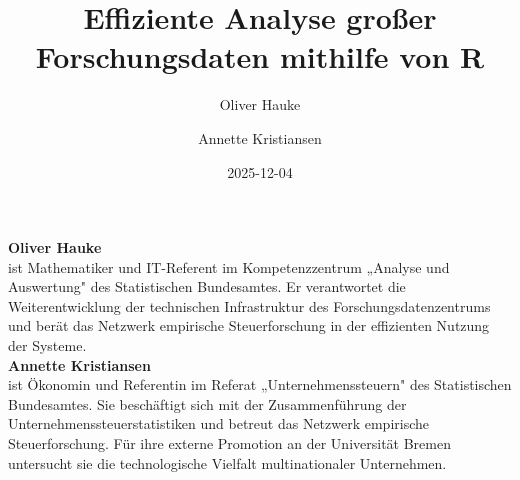 \documentclass[
  german,
  10pt,
  twoside]{article}
\title{Effiziente Analyse großer Forschungsdaten mithilfe von R}
\author{Oliver Hauke \and Annette Kristiansen}
\date{2025-12-04}
\renewcommand{\maketitle}{}
\begin{document}
\maketitle

\begin{titlepage}
\thispagestyle{empty}
\pagestyle{empty}
\onecolumn

\noindent{\color{wistaBlue}\rule{\textwidth}{1pt}}

\vspace{-0.5cm}


\vspace*{0.5cm}

\begin{minipage}[t]{3.9cm}
%
\raggedleft
{}
\fontsize{7}{8.5}\selectfont
\vspace{0pt}%
{\fontsize{8}{9.5}\selectfont\color{wistaBlue}\textbf{Oliver Hauke}}\\[0.15cm]
ist Mathematiker und IT-Referent im Kompetenzzentrum „Analyse und Auswertung" des Statistischen Bundesamtes. Er verantwortet die Weiterentwicklung der technischen Infrastruktur des Forschungsdatenzentrums und berät das Netzwerk empirische Steuerforschung in der effizienten Nutzung der Systeme.\\[0.5cm]

{\fontsize{8}{9.5}\selectfont\color{wistaBlue}\textbf{Annette Kristiansen}}\\[0.15cm]
ist Ökonomin und Referentin im Referat „Unternehmenssteuern" des Statistischen Bundesamtes. Sie beschäftigt sich mit der Zusammenführung der Unternehmenssteuerstatistiken und betreut das Netzwerk empirische Steuerforschung. Für ihre externe Promotion an der Universität Bremen untersucht sie die technologische Vielfalt multinationaler Unternehmen.

\end{minipage}%
\hspace{0.4cm}%
\hspace{0.4cm}%
\begin{minipage}[t]{11.8cm}
\raggedright
\vspace{1.2cm}%


\end{minipage}
\end{titlepage}
\end{document}
